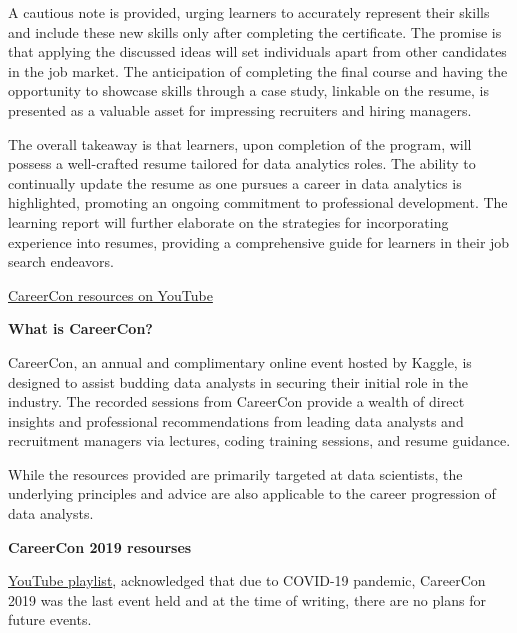 \documentclass[]{article}
\begin{document}
A cautious note is provided, urging learners to accurately represent their skills and include these new skills only after completing the certificate. The promise is that applying the discussed ideas will set individuals apart from other candidates in the job market. The anticipation of completing the final course and having the opportunity to showcase skills through a case study, linkable on the resume, is presented as a valuable asset for impressing recruiters and hiring managers.

The overall takeaway is that learners, upon completion of the program, will possess a well-crafted resume tailored for data analytics roles. The ability to continually update the resume as one pursues a career in data analytics is highlighted, promoting an ongoing commitment to professional development. The learning report will further elaborate on the strategies for incorporating experience into resumes, providing a comprehensive guide for learners in their job search endeavors.

\uline{CareerCon resources on YouTube}

\textbf{What is CareerCon?}

CareerCon, an annual and complimentary online event hosted by Kaggle, is designed to assist budding data analysts in securing their initial role in the industry. The recorded sessions from CareerCon provide a wealth of direct insights and professional recommendations from leading data analysts and recruitment managers via lectures, coding training sessions, and resume guidance.

While the resources provided are primarily targeted at data scientists, the underlying principles and advice are also applicable to the career progression of data analysts.

\textbf{CareerCon 2019 resourses}

\href{https://www.youtube.com/playlist?list=PLqFaTIg4myu-npFrYu6cO7h7AI6bkcOlL}{YouTube playlist}, acknowledged that due to COVID-19 pandemic, CareerCon 2019 was the last event held and at the time of writing, there are no plans for future events.
\end{document}
